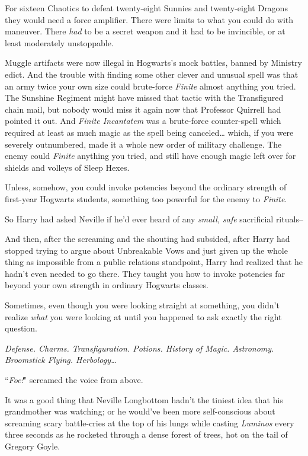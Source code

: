 For sixteen Chaotics to defeat twenty-eight Sunnies and twenty-eight Dragons they would need a force amplifier. There were limits to what you could do with maneuver. There \emph{had} to be a secret weapon and it had to be invincible, or at least moderately unstoppable.

Muggle artifacts were now illegal in Hogwarts's mock battles, banned by Ministry edict. And the trouble with finding some other clever and unusual spell was that an army twice your own size could brute-force \emph{Finite} almost anything you tried. The Sunshine Regiment might have missed that tactic with the Transfigured chain mail, but nobody would miss it again now that Professor Quirrell had pointed it out. And \emph{Finite Incantatem} was a brute-force counter-spell which required at least as much magic as the spell being canceled{\ldots} which, if you were severely outnumbered, made it a whole new order of military challenge. The enemy could \emph{Finite} anything you tried, and still have enough magic left over for shields and volleys of Sleep Hexes.

Unless, somehow, you could invoke potencies beyond the ordinary strength of first-year Hogwarts students, something too powerful for the enemy to \emph{Finite}.

So Harry had asked Neville if he'd ever heard of any \emph{small, safe} sacrificial rituals\---

And then, after the screaming and the shouting had subsided, after Harry had stopped trying to argue about Unbreakable Vows and just given up the whole thing as impossible from a public relations standpoint, Harry had realized that he hadn't even needed to go there. They taught you how to invoke potencies far beyond your own strength in ordinary Hogwarts classes.

Sometimes, even though you were looking straight at something, you didn't realize \emph{what} you were looking at until you happened to ask exactly the right question.

\emph{Defense. Charms. Transfiguration. Potions. History of Magic. Astronomy. Broomstick Flying. Herbology{\ldots}}

``\emph{Foe!}" screamed the voice from above.

\later

It was a good thing that Neville Longbottom hadn't the tiniest idea that his grandmother was watching; or he would've been more self-conscious about screaming scary battle-cries at the top of his lungs while casting \emph{Luminos} every three seconds as he rocketed through a dense forest of trees, hot on the tail of Gregory Goyle.

